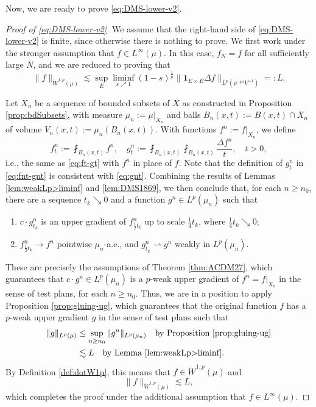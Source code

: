 \documentclass[11pt]{amsart}
\theoremstyle{definition}
\theoremstyle{remark}
\numberwithin{equation}{section}
\newcommand{\Norm}[2]{\|#1\|_{#2}}
\begin{document}
Now, we are ready to prove \eqref{eq:DMS-lower-v2}.
\begin{proof}[Proof of \eqref{eq:DMS-lower-v2}]
We assume that the right-hand side of \eqref{eq:DMS-lower-v2} is finite, since otherwise
there is nothing to prove.
We first work under the stronger assumption that $f\in L^\infty(\mu)$. In this case, $f_N=f$
for all sufficiently large $N$, and we are reduced to proving that
\begin{equation}\label{eq:DMS-lower-v3}
  \Norm{f}{\dot W^{1,p}(\mu)}
  \lesssim\sup_E\liminf_{s\nearrow 1}(1-s)^{\frac1p}
  \Norm{\mathbf{1}_{E\times E}\Delta f}{L^p(\rho^{-ps}V^{-1})}=:L.
\end{equation}


Let $X_n$ be a sequence of bounded subsets of $X$ as constructed in Proposition
\ref{prop:bdSubsets}, with measure $\mu_n:=\mu|_{X_n}$ and balls $B_n(x,t):=B(x,t)\cap X_n$
of volume $V_n(x,t):=\mu_n(B_n(x,t))$.
With functions $f^n:=f|_{X_n}$, we define
\begin{equation}\label{eq:fnt-gnt}
  f^n_t:=\fint_{B_n(x,t)}f^n,\quad
  g^n_t:=\fint_{B_n(x,t)}\fint_{B_n(x,t)}\frac{\Delta f^n}{t},\quad t>0,
\end{equation}
i.e., the same as \eqref{eq:ft-gt} with $f^n$ in place of $f$. Note that the definition of
$g^n_t$ in \eqref{eq:fnt-gnt} is consistent with \eqref{eq:gnt}. Combining the results of
Lemmas \ref{lem:weakLp>liminf} and \ref{lem:DMS1869}, we then
conclude that, for each $n\geq n_0$,
there are a sequence $t_k\searrow 0$ and a function $g^n\in L^p(\mu_n)$ such that
\begin{enumerate}[\rm(i)]
  \item $c\cdot g_{t_k}^n$ is an upper gradient of $f^n_{\frac12 t_k}$ up to scale $\frac14
  t_k$, where $\frac14 t_k\searrow 0$;
  \item $f^n_{\frac12 t_k}\to f^n$ pointwise $\mu_n$-a.e., and $g^n_{t_k}\rightharpoonup
  g^n$ weakly in $L^p(\mu_n)$.
\end{enumerate}
These are precisely the assumptions of Theorem \ref{thm:ACDM27},
which guarantees that $c\cdot g^n\in L^p(\mu_n)$ is a $p$-weak upper gradient of $f^n=f|_{X_n}$ in
the sense of test plans, for each $n\geq n_0$. Thus, we are in a position to apply
Proposition \ref{prop:gluing-ug}, which guarantees that the original function $f$ has a
$p$-weak upper gradient $g$ in the sense of test plans such that
\begin{equation*}
\begin{split}
  \Norm{g}{L^p(\mu)}  &\leq\sup_{n\geq n_0}\Norm{g^n}{L^p(\mu_n)}
  \quad\text{by Proposition \ref{prop:gluing-ug}} \\
  &\lesssim L
  \quad\text{by Lemma \ref{lem:weakLp>liminf}}.
\end{split}
\end{equation*}
By Definition \ref{def:dotW1p}, this means that $f\in \dot W^{1,p}(\mu)$ and
\begin{equation*}
  \Norm{f}{\dot W^{1,p}(\mu)}\lesssim L,
\end{equation*}
which completes the proof under the additional assumption that $f\in L^\infty(\mu)$.


\end{proof}
\end{document}
